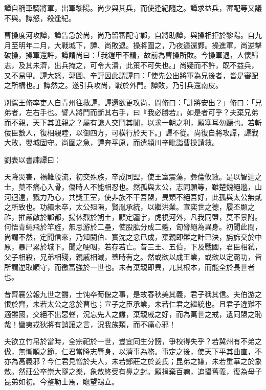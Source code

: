 
\begin{pinyinscope}
譚自稱車騎將軍，出軍黎陽。尚少與其兵，而使逢紀隨之。譚求益兵，審配等又議不與。譚怒，殺逢紀。

曹操度河攻譚，譚告急於尚，尚乃留審配守鄴，自將助譚，與操相拒於黎陽。自九月至明年二月，大戰城下，譚、尚敗退。操將圍之，乃夜遁還鄴。操進軍，尚逆擊破操，操軍還許，譚謂尚曰：「我鎧甲不精，故前為曹操所敗。今操軍退，人懷歸志，及其未濟，出兵掩之，可令大潰，此策不可失也。」尚疑而不許，既不益兵，又不易甲。譚大怒，郭圖、辛評因此謂譚曰：「使先公出將軍為兄後者，皆是審配之所構也。」譚然之。遂引兵攻尚，戰於外門。譚敗，乃引兵還南皮。

別駕王脩率吏人自青州往救譚，譚還欲更攻尚，問脩曰：「計將安出？」脩曰：「兄弟者，左右手也。譬人將鬥而斷其右手，曰『我必勝若』，如是者可乎？夫棄兄弟而不親，天下其誰親之？屬有讒人交鬥其閒，以求一朝之利，願塞耳勿聽也。若斬佞臣數人，復相親睦，以御四方，可橫行於天下。」譚不從。尚復自將攻譚，譚戰大敗，嬰城固守。尚圍之急，譚奔平原，而遣潁川辛毗詣曹操請救。

劉表以書諫譚曰：

天降災害，禍難殷流，初交殊族，卒成同盟，使王室震蕩，彝倫攸斁。是以智達之士，莫不痛心入骨，傷時人不能相忍也。然孤與太公，志同願等，雖楚魏絕邈，山河迥遠，戮力乃心，共獎王室，使非族不干吾盟，異類不絕吾好，此孤與太公無貳之所致也。功績未卒，太公殂隕，賢胤承統，以繼洪業。宣奕世之德，履丕顯之祚，摧嚴敵於鄴都，揚休烈於朔土，顧定疆宇，虎視河外，凡我同盟，莫不景附。何悟青蠅飛於竿旌，無忌游於二壘，使股肱分成二體，匈膂絕為異身。初聞此問，尚謂不然，定聞信來，乃知閼伯、實沈之忿已成，棄親即讎之計已決，旃旆交於中原，暴尸累於城下。聞之哽咽，若存若亡。昔三王、五伯，下及戰國，君臣相弒，父子相殺，兄弟相殘，親戚相滅，蓋時有之。然或欲以成王業，或欲以定霸功，皆所謂逆取順守，而徼富強於一世也。未有棄親即異，兀其根本，而能全於長世者也。

昔齊襄公報九世之讎，士饨卒荀偃之事，是故春秋美其義，君子稱其信。夫伯游之恨於齊，未若太公之忿於曹也；宣子之臣承業，未若仁君之繼統也。且君子違難不適讎國，交絕不出惡聲，況忘先人之讎，棄親戚之好，而為萬世之戒，遺同盟之恥哉！蠻夷戎狄將有誚讓之言，況我族類，而不痛心邪！

夫欲立竹帛於當時，全宗祀於一世，豈宜同生分謗，爭校得失乎？若冀州有不弟之傲，無慚順之節，仁君當降志辱身，以濟事為務。事定之後，使天下平其曲直，不亦為高義邪？今仁君見憎於夫人，未若鄭莊之於姜氏；昆弟之嫌，未若重華之於象敖。然莊公卒崇大隧之樂，象敖終受有鼻之封。願捐棄百痾，追攝舊義，復為母子昆弟如初。今整勒士馬，瞻望鵠立。


\end{pinyinscope}
